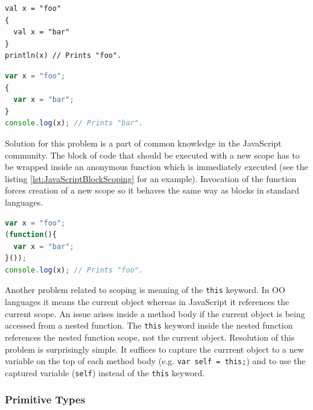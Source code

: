 \documentclass[12pt,a4paper]{report}
\begin{document}
\begin{center}
\begin{minipage}{.48\textwidth}
  \begin{lstlisting}[caption={Scala scoping.},label={lst:ScalaScoping}]
val x = "foo"
{ 
  val x = "bar" 
}
println(x) // Prints "foo".
	\end{lstlisting}
\end{minipage}
\hfill
\begin{minipage}{.48\textwidth}
  \begin{lstlisting}[language=JavaScript,caption={JavaScript scoping.},label={lst:JavaScriptScoping}]
var x = "foo";
{ 
  var x = "bar";
}
console.log(x); // Prints "bar".
  \end{lstlisting}
\end{minipage}
\end{center}

Solution for this problem is a part of common knowledge in the JavaScript community. The block of code that should be executed with a new scope has to be wrapped inside an anonymous function which is immediately executed (see the listing \ref{lst:JavaScriptBlockScoping} for an example). Invocation of the function forces creation of a new scope so it behaves the same way as blocks in standard languages.

\begin{minipage}{\linewidth}
\begin{lstlisting}[language=JavaScript,caption={Emulation of block scope in JavaScript.},label={lst:JavaScriptBlockScoping}]
var x = "foo";
(function(){ 
  var x = "bar";
}());
console.log(x); // Prints "foo".
\end{lstlisting}
\end{minipage}

Another problem related to scoping is meaning of the \texttt{this} keyword. In OO languages it means the current object whereas in JavaScript it references the current scope. An issue arises inside a method body if the current object is being accessed from a nested function. The \texttt{this} keyword inside the nested function references the nested function scope, not the current object. Resolution of this problem is surprisingly simple. It suffices to capture the currrent object to a new variable on the top of each method body (e.g. \texttt{var self = this;}) and to use the captured variable (\texttt{self}) instead of the \texttt{this} keyword.

\subsubsection*{Primitive Types}
\end{document}
